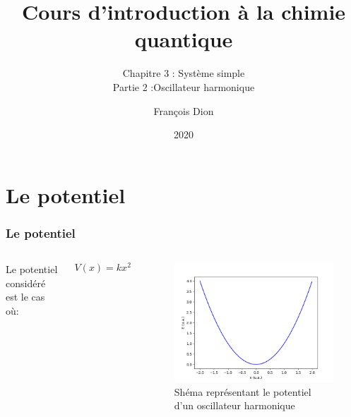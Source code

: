 \documentclass[aspectratio=169]{beamer}
\title{Cours d'introduction à la chimie quantique}
\subtitle{Chapitre 3 : Système simple\\Partie 2 :Oscillateur harmonique}
\author{François Dion}
\date{2020}
\begin{document}
\frame{\titlepage}




\section{Le potentiel}
\begin{frame}
\frametitle{Le potentiel}
\begin{columns}
Le potentiel considéré est le cas où:


\begin{equation} \tag{1}
V(x)=kx^2
\end{equation} 
\begin{figure}
\includegraphics[scale=0.4]{Pot}
\caption{Shéma représentant le potentiel d'un oscillateur harmonique}
\end{figure}
\end{columns}
\end{frame}
\end{document}
